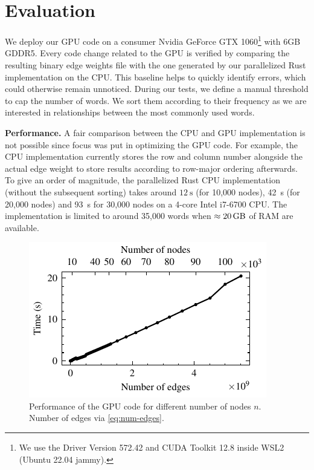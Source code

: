 \section{Evaluation}
\label{sec:eval}

We deploy our GPU code on a consumer Nvidia GeForce GTX 1060\footnote{We use the Driver Version 572.42 and CUDA Toolkit 12.8 inside WSL2 (Ubuntu 22.04 jammy).} with 6GB GDDR5. Every code change related to the GPU is verified by comparing the resulting binary edge weights file with the one generated by our parallelized Rust implementation on the CPU. This baseline helps to quickly identify errors, which could otherwise remain unnoticed. During our tests, we define a manual threshold to cap the number of words. We sort them according to their frequency as we are interested in relationships between the most commonly used words.

\vspace{-0.2em}

\textbf{Performance.} A fair comparison between the CPU and GPU implementation is not possible since focus was put in optimizing the GPU code. For example, the CPU implementation currently stores the row and column number alongside the actual edge weight to store results according to row-major ordering afterwards. To give an order of magnitude, the parallelized Rust CPU implementation (without the subsequent sorting) takes around $\qty{12}{\s}$ (for 10,000 nodes), \qty{42}{\s} (for 20,000 nodes) and \qty{93}{\s} for 30,000 nodes on a 4-core Intel i7-6700 CPU. The implementation is limited to around 35,000 words when $\approx\qty{20}{\giga\byte}$ of RAM are available.

\vspace{-1.2em}

\begin{figure}[H]
    \centering
    \includegraphics[width=\linewidth]{assets/timing.pdf}
    \caption{Performance of the GPU code for different number of nodes $n$. Number of edges via \eqref{eq:num-edges}.}
    \label{fig:timing}
\end{figure}

